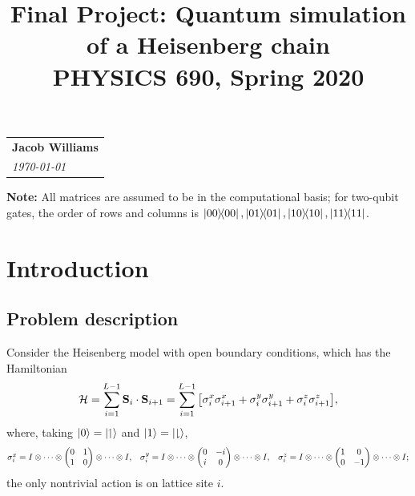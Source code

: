 \documentclass[10pt]{amsart}
\title{Final Project: Quantum simulation of a Heisenberg chain\\ 
       PHYSICS 690, Spring 2020}
\theoremstyle{definition}
\newcommand{\Sum}{\ensuremath{\displaystyle\sum}}          %
\newcommand{\tens}{\ensuremath{\otimes}}                   %
\newcommand{\Ham}{\ensuremath{\mathcal{H}}}                %
\newcommand{\spu}{\ensuremath{\upharpoonleft}}             %
\newcommand{\spd}{\ensuremath{\downharpoonright}}          %
\begin{document}
\hfill\begin{tabular}[t]{l@{}}                %
  \textbf{Jacob Williams} \\
  \textit{\today}
\end{tabular}

\maketitle

\textbf{Note:} All matrices are assumed to be in the computational basis; for
two-qubit gates, the order of rows and columns is
$\op{00}, \op{01}, \op{10}, \op{11}$.

\vspace{1em}

\section{Introduction} \label{sec:intro}

\subsection{Problem description} \label{subsec:heisenberg}

Consider the Heisenberg model with open boundary conditions, which has the
Hamiltonian
\[
  \Ham = \Sum_{i=1}^{L-1} \vb{S}_i \cdot \vb{S}_{i+1}
    = \Sum_{i=1}^{L-1} \qty[\sigma_i^x \sigma_{i+1}^x 
        + \sigma_i^y \sigma_{i+1}^y + \sigma_i^z \sigma_{i+1}^z],
\]
where, taking $\ket{0} = \ket{\spu}$ and $\ket{1} = \ket{\spd}$,
\[ \mqty{
  \sigma_i^x = I \tens \cdots \tens \mqty(0 & 1 \\ 1 & 0) \tens \cdots \tens I, &
  \sigma_i^y = I \tens \cdots \tens \mqty(0 & -i \\ i & 0) \tens \cdots \tens I, &
  \sigma_i^z = I \tens \cdots \tens \mqty(1 & 0 \\ 0 & -1) \tens \cdots \tens I;
} \]
the only nontrivial action is on lattice site $i$.
\end{document}
